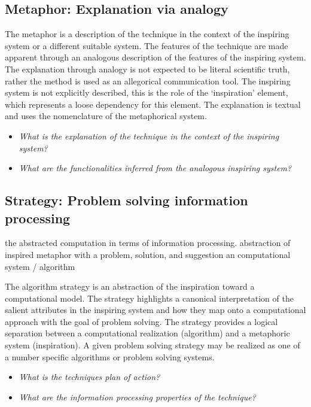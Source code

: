 \documentclass[a4paper, 11pt]{article}
\begin{document}
\subsection{Metaphor: Explanation via analogy}
The metaphor is a description of the technique in the context of the inspiring system or a different suitable system. The features of the technique are made apparent through an analogous description of the features of the inspiring system. The explanation through analogy is not expected to be literal scientific truth, rather the method is used as an allegorical communication tool. The inspiring system is not explicitly described, this is the role of the `inspiration' element, which represents a loose dependency for this element. The explanation is textual and uses the nomenclature of the metaphorical system. 

\begin{itemize}
	\item \emph{What is the explanation of the technique in the context of the inspiring system?}
	\item \emph{What are the functionalities inferred from the analogous inspiring system?}
\end{itemize}

\subsection{Strategy: Problem solving information processing}
the abstracted computation in terms of information processing. abstraction of inspired metaphor with a problem, solution, and suggestion an computational system / algorithm

The algorithm strategy is an abstraction of the inspiration toward a computational model. The strategy highlights a canonical interpretation of the salient attributes in the inspiring system and how they map onto a computational approach with the goal of problem solving. The strategy provides a logical separation between a computational realization (algorithm) and a metaphoric system (inspiration). A given problem solving strategy may be realized as one of a number specific algorithms or problem solving systems.

\begin{itemize}
	\item \emph{What is the techniques plan of action?}
	\item \emph{What are the information processing properties of the technique?}
\end{itemize}
\end{document}
